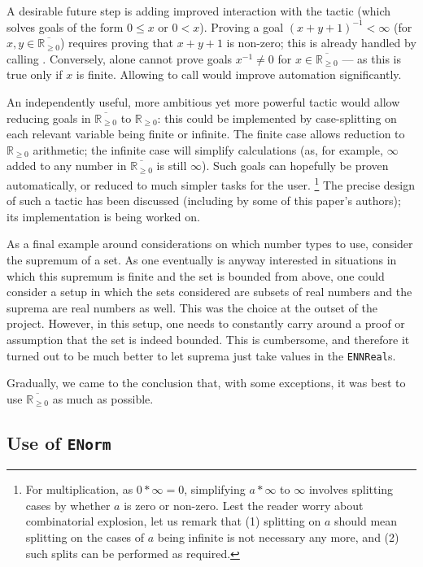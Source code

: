 \documentclass[12pt]{amsart}
\newcommand*{\real}{\mathbb{R}} %
\newcommand{\nnreal}{\real_{\ge0}}
\newcommand{\ennreal}{\overline{\real_{\ge0}}}
\theoremstyle{definition}
\theoremstyle{plain}
\begin{document}
A desirable future step is adding improved interaction with the  tactic (which solves goals of the form \texttt{$0 \leq x$} or \texttt{$0 < x$}). Proving a goal \texttt{$(x + y + 1)^{-1}<\infty$} (for $x,y\in\ennreal$) requires proving that $x + y + 1$ is non-zero; this is already handled by calling . Conversely,  alone cannot prove goals \texttt{$x^{-1}\neq 0$} for $x\in\ennreal$ --- as this is true only if $x$ is finite. Allowing  to call  would improve automation significantly.

An independently useful, more ambitious yet more powerful tactic would allow reducing goals in $\ennreal$ to $\nnreal$: this could be implemented by case-splitting on each relevant variable being finite or infinite. The finite case allows reduction to $\nnreal$ arithmetic; the infinite case will simplify calculations (as, for example, $\infty$ added to any number in $\ennreal$ is still $\infty$). Such goals can hopefully be proven automatically, or reduced to much simpler tasks for the user.
\footnote{For multiplication, as $0 * \infty = 0$, simplifying $a*\infty$ to $\infty$ involves splitting cases by whether $a$ is zero or non-zero. Lest the reader worry about combinatorial explosion, let us remark that (1) splitting on $a$ should mean splitting on the cases of $a$ being infinite is not necessary any more, and (2) such splits can be performed as required.}
The precise design of such a tactic has been discussed (including by some of this paper's authors); its implementation is being worked on.

As a final example around considerations on which number types to use,
consider the supremum of a set.
As one eventually is anyway interested in situations in which this supremum is finite and the set
is bounded from above, one could consider a setup in which the sets considered are subsets of
real numbers and the suprema are real numbers as well.
This was the choice at the outset of the project.
However, in this setup, one needs to constantly carry around a proof or assumption that the
set is indeed bounded.
This is cumbersome, and therefore it turned out to be much better to
let suprema just take values in the \texttt{ENNReal}s.

Gradually, we came to the conclusion that, with some exceptions, it was best to use $\ennreal$ as much as possible.

\subsection{Use of \texttt{ENorm}}\label{subsec:enorm}
\end{document}
